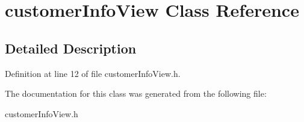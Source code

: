 \hypertarget{interfacecustomer_info_view}{
\section{customerInfoView Class Reference}
\label{interfacecustomer_info_view}
}


\subsection{Detailed Description}


Definition at line 12 of file customerInfoView.h.



The documentation for this class was generated from the following file:\begin{DoxyCompactItemize}
\item 
customerInfoView.h\end{DoxyCompactItemize}
